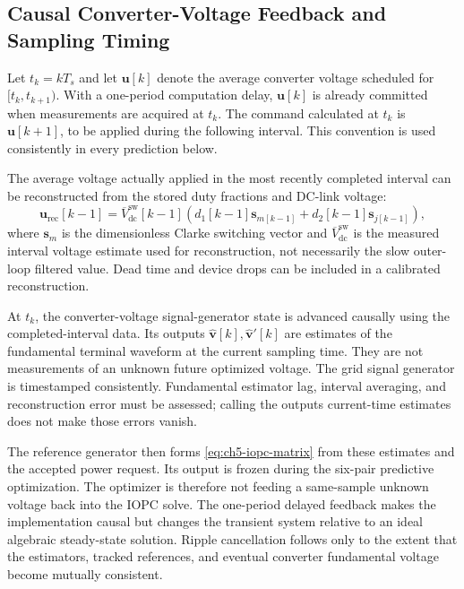\subsection{Causal Converter-Voltage Feedback and Sampling Timing}
Let $t_k=kT_s$ and let $\mathbf u[k]$ denote the average converter voltage scheduled for $[t_k,t_{k+1})$. With a one-period computation delay, $\mathbf u[k]$ is already committed when measurements are acquired at $t_k$. The command calculated at $t_k$ is $\mathbf u[k+1]$, to be applied during the following interval. This convention is used consistently in every prediction below.

The average voltage actually applied in the most recently completed interval can be reconstructed from the stored duty fractions and DC-link voltage:
\begin{equation}
\mathbf u_{\mathrm{rec}}[k-1]=\overline V_{\mathrm{dc}}^{\mathrm{sw}}[k-1]
\left(d_1[k-1]\mathbf s_{m[k-1]}+d_2[k-1]\mathbf s_{j[k-1]}\right),
\label{eq:ch5-reconstruction}
\end{equation}
where $\mathbf s_m$ is the dimensionless Clarke switching vector and $\overline V_{\mathrm{dc}}^{\mathrm{sw}}$ is the measured interval voltage estimate used for reconstruction, not necessarily the slow outer-loop filtered value. Dead time and device drops can be included in a calibrated reconstruction.

At $t_k$, the converter-voltage signal-generator state is advanced causally using the completed-interval data. Its outputs $\widehat{\mathbf v}[k],\widehat{\mathbf v}'[k]$ are estimates of the fundamental terminal waveform at the current sampling time. They are not measurements of an unknown future optimized voltage. The grid signal generator is timestamped consistently. Fundamental estimator lag, interval averaging, and reconstruction error must be assessed; calling the outputs current-time estimates does not make those errors vanish.

The reference generator then forms \eqref{eq:ch5-iopc-matrix} from these estimates and the accepted power request. Its output is frozen during the six-pair predictive optimization. The optimizer is therefore not feeding a same-sample unknown voltage back into the IOPC solve. The one-period delayed feedback makes the implementation causal but changes the transient system relative to an ideal algebraic steady-state solution. Ripple cancellation follows only to the extent that the estimators, tracked references, and eventual converter fundamental voltage become mutually consistent.

